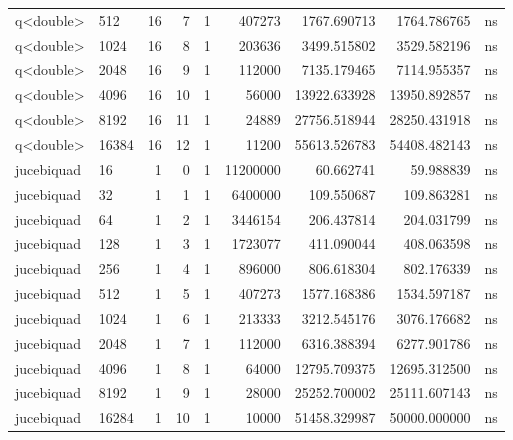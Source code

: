 \begin{tabular}{llrrrrrrl}
q<double> & 512 & 16 & 7 & 1 & 407273 & 1767.690713 & 1764.786765 & ns \\
q<double> & 1024 & 16 & 8 & 1 & 203636 & 3499.515802 & 3529.582196 & ns \\
q<double> & 2048 & 16 & 9 & 1 & 112000 & 7135.179465 & 7114.955357 & ns \\
q<double> & 4096 & 16 & 10 & 1 & 56000 & 13922.633928 & 13950.892857 & ns \\
q<double> & 8192 & 16 & 11 & 1 & 24889 & 27756.518944 & 28250.431918 & ns \\
q<double> & 16384 & 16 & 12 & 1 & 11200 & 55613.526783 & 54408.482143 & ns \\
jucebiquad & 16 & 1 & 0 & 1 & 11200000 & 60.662741 & 59.988839 & ns \\
jucebiquad & 32 & 1 & 1 & 1 & 6400000 & 109.550687 & 109.863281 & ns \\
jucebiquad & 64 & 1 & 2 & 1 & 3446154 & 206.437814 & 204.031799 & ns \\
jucebiquad & 128 & 1 & 3 & 1 & 1723077 & 411.090044 & 408.063598 & ns \\
jucebiquad & 256 & 1 & 4 & 1 & 896000 & 806.618304 & 802.176339 & ns \\
jucebiquad & 512 & 1 & 5 & 1 & 407273 & 1577.168386 & 1534.597187 & ns \\
jucebiquad & 1024 & 1 & 6 & 1 & 213333 & 3212.545176 & 3076.176682 & ns \\
jucebiquad & 2048 & 1 & 7 & 1 & 112000 & 6316.388394 & 6277.901786 & ns \\
jucebiquad & 4096 & 1 & 8 & 1 & 64000 & 12795.709375 & 12695.312500 & ns \\
jucebiquad & 8192 & 1 & 9 & 1 & 28000 & 25252.700002 & 25111.607143 & ns \\
jucebiquad & 16284 & 1 & 10 & 1 & 10000 & 51458.329987 & 50000.000000 & ns \\
\bottomrule
\end{tabular}
